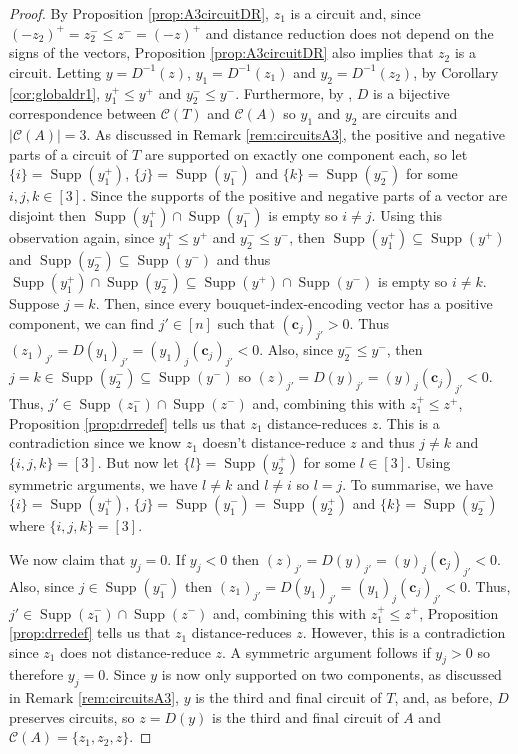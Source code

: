 \documentclass[a4paper, 12pt]{article}
\theoremstyle{plain}
\theoremstyle{definition}
\theoremstyle{remark}
\begin{document}
\begin{proof}
    By Proposition \ref{prop:A3circuitDR}, $z_1$ is a circuit and, since $(-z_2)^+=z_2^- \le z^-=(-z)^+$ and distance reduction does not depend on the signs of the vectors, Proposition \ref{prop:A3circuitDR} also implies that $z_2$ is a circuit. Letting $y=D^{-1}(z)$, $y_1=D^{-1}(z_1)$ and $y_2=D^{-1}(z_2)$, by Corollary \ref{cor:globaldr1}, $y_1^+ \le y^+$ and $y_2^- \le y^-$. Furthermore, by \cite[Theorem 1.11]{petrovic2018bouquet}, $D$ is a bijective correspondence between $\mathcal{C}(T)$ and $\mathcal{C}(A)$ so $y_1$ and $y_2$ are circuits and $|\mathcal{C}(A)|=3$. As discussed in Remark \ref{rem:circuitsA3}, the positive and negative parts of a circuit of $T$ are supported on exactly one component each, so let $\{i\}=\operatorname{Supp}(y_1^+)$, $\{j\}=\operatorname{Supp}(y_1^-)$ and $\{k\}=\operatorname{Supp}(y_2^-)$ for some $i,j,k \in [3]$. Since the supports of the positive and negative parts of a vector are disjoint then $\operatorname{Supp}(y_1^+) \cap \operatorname{Supp}(y_1^-)$ is empty so $i \neq j$. Using this observation again, since $y_1^+ \le y^+$ and $y_2^- \le y^-$, then $\operatorname{Supp}(y_1^+) \subseteq \operatorname{Supp}(y^+)$ and $\operatorname{Supp}(y_2^-) \subseteq  \operatorname{Supp}(y^-)$ and thus $\operatorname{Supp}(y_1^+) \cap \operatorname{Supp}(y_2^-) \subseteq \operatorname{Supp}(y^+) \cap \operatorname{Supp}(y^-)$ is empty so $i \neq k$. Suppose $j=k$. Then, since every bouquet-index-encoding vector has a positive component, we can find $j' \in [n]$ such that $(\mathbf{c}_j)_{j'}>0$. Thus $(z_1)_{j'}=D(y_1)_{j'}=(y_1)_j (\mathbf{c}_j)_{j'}<0$. Also, since $y_2^- \le y^-$, then $j=k\in \operatorname{Supp}(y_2^-) \subseteq \operatorname{Supp}(y^-)$ so $(z)_{j'}=D(y)_{j'}=(y)_j (\mathbf{c}_j)_{j'}<0$. Thus, $j' \in \operatorname{Supp}(z_1^-) \cap \operatorname{Supp}(z^-)$ and, combining this with $z_1^+ \le z^+$, Proposition \ref{prop:drredef} tells us that $z_1$ distance-reduces $z$. This is a contradiction since we know $z_1$ doesn't distance-reduce $z$ and thus $j \neq k$ and $\{i,j,k\}=[3]$. But now let $\{l\}=\operatorname{Supp}(y_2^+)$ for some $l \in [3]$. Using symmetric arguments, we have $l \neq k$ and $l \neq i$ so $l=j$. To summarise, we have $\{i\}=\operatorname{Supp}(y_1^+)$, $\{j\}=\operatorname{Supp}(y_1^-)=\operatorname{Supp}(y_2^+)$ and $\{k\}=\operatorname{Supp}(y_2^-)$ where $\{i,j,k\} =[3]$.

    We now claim that $y_j=0$. If $y_j<0$ then $(z)_{j'}=D(y)_{j'}=(y)_j (\mathbf{c}_j)_{j'}<0$. Also, since $j \in \operatorname{Supp}(y_1^-)$ then $(z_1)_{j'}=D(y_1)_{j'}=(y_1)_j (\mathbf{c}_j)_{j'}<0$. Thus, $j' \in \operatorname{Supp}(z_1^-) \cap \operatorname{Supp}(z^-)$ and, combining this with $z_1^+ \le z^+$, Proposition \ref{prop:drredef} tells us that $z_1$ distance-reduces $z$. However, this is a contradiction since $z_1$ does not distance-reduce $z$. A symmetric argument follows if $y_j>0$ so therefore $y_j=0$. Since $y$ is now only supported on two components, as discussed in Remark \ref{rem:circuitsA3}, $y$ is the third and final circuit of $T$, and, as before, $D$ preserves circuits, so $z=D(y)$ is the third and final circuit of $A$ and $\mathcal{C}(A)=\{z_1,z_2,z\}$.
\end{proof}
\end{document}
